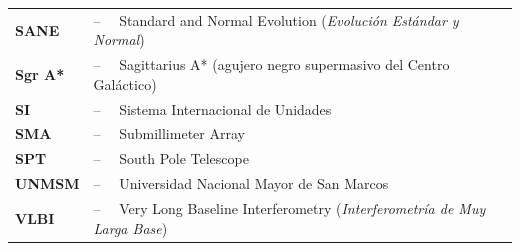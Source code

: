 \begin{tabular}{p{2.2cm}l}
\textbf{SANE}   & --$\quad$ Standard and Normal Evolution (\textit{Evolución Estándar y Normal})\\
\textbf{Sgr A*} & --$\quad$ Sagittarius A* (agujero negro supermasivo del Centro Galáctico)\\
\textbf{SI}     & --$\quad$ Sistema Internacional de Unidades\\
\textbf{SMA}    & --$\quad$ Submillimeter Array\\
\textbf{SPT}    & --$\quad$ South Pole Telescope\\
\textbf{UNMSM}  & --$\quad$ Universidad Nacional Mayor de San Marcos\\
\textbf{VLBI}   & --$\quad$ Very Long Baseline Interferometry (\textit{Interferometría de Muy Larga Base})\\
\end{tabular}